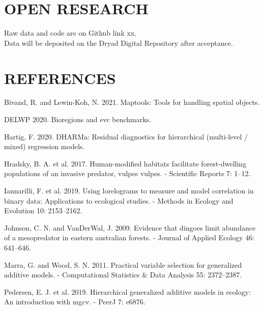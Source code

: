 \documentclass[]{elsarticle} %
\begin{document}
\hypertarget{open-research}{%
\section{OPEN RESEARCH}\label{open-research}}

Raw data and code are on Github link xx.\\
Data will be deposited on the Dryad Digital Repository after acceptance.

\newpage

\hypertarget{references}{%
\section*{REFERENCES}\label{references}}

\hypertarget{refs}{}
\leavevmode\hypertarget{ref-maptools}{}%
Bivand, R. and Lewin-Koh, N. 2021. Maptools: Tools for handling spatial objects.

\leavevmode\hypertarget{ref-delwp2020}{}%
DELWP 2020. Bioregions and evc benchmarks.

\leavevmode\hypertarget{ref-DHARMa}{}%
Hartig, F. 2020. DHARMa: Residual diagnostics for hierarchical (multi-level / mixed) regression models.

\leavevmode\hypertarget{ref-hradsky2017human}{}%
Hradsky, B. A. et al. 2017. Human-modified habitats facilitate forest-dwelling populations of an invasive predator, vulpes vulpes. - Scientific Reports 7: 1--12.

\leavevmode\hypertarget{ref-https:ux2fux2fdoi.orgux2f10.1111ux2f2041-210X.13308}{}%
Iannarilli, F. et al. 2019. Using lorelograms to measure and model correlation in binary data: Applications to ecological studies. - Methods in Ecology and Evolution 10: 2153--2162.

\leavevmode\hypertarget{ref-https:ux2fux2fdoi.orgux2f10.1111ux2fj.1365-2664.2009.01650.x}{}%
Johnson, C. N. and VanDerWal, J. 2009. Evidence that dingoes limit abundance of a mesopredator in eastern australian forests. - Journal of Applied Ecology 46: 641--646.

\leavevmode\hypertarget{ref-MARRA20112372}{}%
Marra, G. and Wood, S. N. 2011. Practical variable selection for generalized additive models. - Computational Statistics \& Data Analysis 55: 2372--2387.

\leavevmode\hypertarget{ref-pedersen2019hierarchical}{}%
Pedersen, E. J. et al. 2019. Hierarchical generalized additive models in ecology: An introduction with mgcv. - PeerJ 7: e6876.
\end{document}
